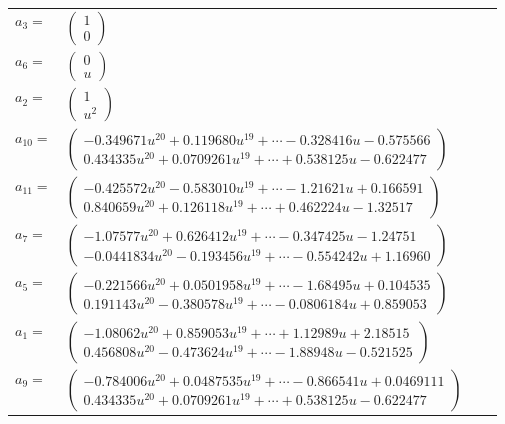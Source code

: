 \documentclass[1p]{elsarticle_modified}
\theoremstyle{definition}
\begin{document}
\begin{tabular}{m{7pt} m{180pt} m{7pt} m{180pt} }
\flushright $a_{3}=$&$\begin{pmatrix}1\\0\end{pmatrix}$ \\
\flushright $a_{6}=$&$\begin{pmatrix}0\\u\end{pmatrix}$ \\
\flushright $a_{2}=$&$\begin{pmatrix}1\\u^2\end{pmatrix}$ \\
\flushright $a_{10}=$&$\begin{pmatrix}-0.349671 u^{20}+0.119680 u^{19}+\cdots-0.328416 u-0.575566\\0.434335 u^{20}+0.0709261 u^{19}+\cdots+0.538125 u-0.622477\end{pmatrix}$ \\
\flushright $a_{11}=$&$\begin{pmatrix}-0.425572 u^{20}-0.583010 u^{19}+\cdots-1.21621 u+0.166591\\0.840659 u^{20}+0.126118 u^{19}+\cdots+0.462224 u-1.32517\end{pmatrix}$ \\
\flushright $a_{7}=$&$\begin{pmatrix}-1.07577 u^{20}+0.626412 u^{19}+\cdots-0.347425 u-1.24751\\-0.0441834 u^{20}-0.193456 u^{19}+\cdots-0.554242 u+1.16960\end{pmatrix}$ \\
\flushright $a_{5}=$&$\begin{pmatrix}-0.221566 u^{20}+0.0501958 u^{19}+\cdots-1.68495 u+0.104535\\0.191143 u^{20}-0.380578 u^{19}+\cdots-0.0806184 u+0.859053\end{pmatrix}$ \\
\flushright $a_{1}=$&$\begin{pmatrix}-1.08062 u^{20}+0.859053 u^{19}+\cdots+1.12989 u+2.18515\\0.456808 u^{20}-0.473624 u^{19}+\cdots-1.88948 u-0.521525\end{pmatrix}$ \\
\flushright $a_{9}=$&$\begin{pmatrix}-0.784006 u^{20}+0.0487535 u^{19}+\cdots-0.866541 u+0.0469111\\0.434335 u^{20}+0.0709261 u^{19}+\cdots+0.538125 u-0.622477\end{pmatrix}$ \\

\end{tabular}
\end{document}
